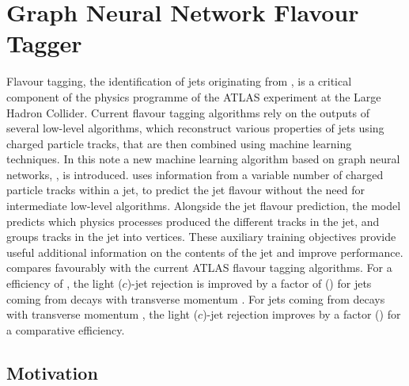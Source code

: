 \chapter{Graph Neural Network Flavour Tagger}\label{chap:gnn_tagger}

Flavour tagging, the identification of jets originating from \bcquarks, is a critical component of the physics programme of the ATLAS experiment at the Large Hadron Collider. 
Current flavour tagging algorithms rely on the outputs of several low-level algorithms, which reconstruct various properties of jets using charged particle tracks, that are then combined using machine learning techniques.
In this note a new machine learning algorithm based on graph neural networks, \GNN, is introduced.
\GNN uses information from a variable number of charged particle tracks within a jet, to predict the jet flavour without the need for intermediate low-level algorithms.
Alongside the jet flavour prediction, the model predicts which physics processes produced the different tracks in the jet, and groups tracks in the jet into vertices.
These auxiliary training objectives provide useful additional information on the contents of the jet and improve performance.
\GNN compares favourably with the current ATLAS flavour tagging algorithms.
For a \bjet efficiency of , the light ($c$)-jet rejection is improved by a factor of \ttbllo (\ttbclo) for jets coming from \ttbar decays with transverse momentum \ttbarpt.
For jets coming from \Zprime decays with transverse momentum \Zprimept, the light ($c$)-jet rejection improves by a factor \zpbllo (\zpbclo) for a comparative  \bjet efficiency.



\section{Motivation}\label{sec:gnn_motvation}


\newcommand{\fakesfootnote}{%
A fake track is defined as a track with a truth-matching probability less than $0.5$, where the truth-matching probability is defined in Ref.~\cite{PERF-2015-08}.
}

